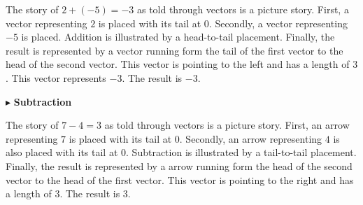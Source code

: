 \documentclass{ximera}
\begin{document}
The story of $2+(-5)=-3$ as told through vectors is a picture story.  First, a vector representing $2$ is placed with its tail at $0$.  Secondly, a vector representing $-5$ is placed.  Addition is illustrated by a head-to-tail placement.  Finally, the result is represented by a vector running form the tail of the first vector to the head of the second vector. This vector is pointing to the left and has a length of $3$.  This vector represents $-3$. The result is $-3$.




  \begin{image}
  \end{image}















$\blacktriangleright$ \textbf{Subtraction}





The story of $7 - 4 = 3$ as told through vectors is a picture story.  First, an arrow representing $7$ is placed with its tail at $0$.  Secondly, an arrow representing $4$ is also placed with its tail at $0$.  Subtraction is illustrated by a tail-to-tail placement.  Finally, the result is represented by a arrow running form the head of the second vector to the head of the first vector. This vector is pointing to the right and has a length of $3$.  The result is $3$.
\end{document}
